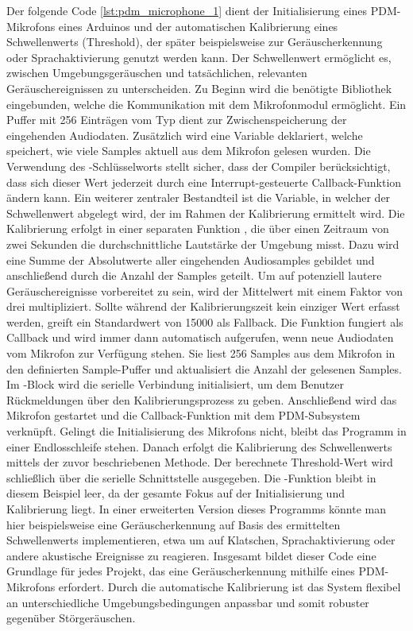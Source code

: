 Der folgende Code \ref{lst:pdm_microphone_1} dient der Initialisierung eines PDM-Mikrofons eines Arduinos und der automatischen Kalibrierung eines Schwellenwerts (Threshold), der später beispielsweise zur Geräuscherkennung oder Sprachaktivierung genutzt werden kann. Der Schwellenwert ermöglicht es, zwischen Umgebungsgeräuschen und tatsächlichen, relevanten Geräuschereignissen zu unterscheiden.
Zu Beginn wird die benötigte Bibliothek  eingebunden, welche die Kommunikation mit dem Mikrofonmodul ermöglicht. Ein Puffer mit 256 Einträgen vom Typ  dient zur Zwischenspeicherung der eingehenden Audiodaten. Zusätzlich wird eine  Variable  deklariert, welche speichert, wie viele Samples aktuell aus dem Mikrofon gelesen wurden. Die Verwendung des -Schlüsselworts stellt sicher, dass der Compiler berücksichtigt, dass sich dieser Wert jederzeit durch eine Interrupt-gesteuerte Callback-Funktion ändern kann.
Ein weiterer zentraler Bestandteil ist die Variable, in welcher der Schwellenwert abgelegt wird, der im Rahmen der Kalibrierung ermittelt wird. Die Kalibrierung erfolgt in einer separaten Funktion , die über einen Zeitraum von zwei Sekunden die durchschnittliche Lautstärke der Umgebung misst. Dazu wird eine Summe der Absolutwerte aller eingehenden Audiosamples gebildet und anschließend durch die Anzahl der Samples geteilt. Um auf potenziell lautere Geräuschereignisse vorbereitet zu sein, wird der Mittelwert mit einem Faktor von drei multipliziert. Sollte während der Kalibrierungszeit kein einziger Wert erfasst werden, greift ein Standardwert von 15000 als Fallback.
Die Funktion  fungiert als Callback und wird immer dann automatisch aufgerufen, wenn neue Audiodaten vom Mikrofon zur Verfügung stehen. Sie liest 256 Samples aus dem Mikrofon in den definierten Sample-Puffer und aktualisiert die Anzahl der gelesenen Samples.
Im -Block wird die serielle Verbindung initialisiert, um dem Benutzer Rückmeldungen über den Kalibrierungsprozess zu geben. Anschließend wird das Mikrofon gestartet und die Callback-Funktion mit dem PDM-Subsystem verknüpft. Gelingt die Initialisierung des Mikrofons nicht, bleibt das Programm in einer Endlosschleife stehen. Danach erfolgt die Kalibrierung des Schwellenwerts mittels der zuvor beschriebenen Methode. Der berechnete Threshold-Wert wird schließlich über die serielle Schnittstelle ausgegeben.
Die -Funktion bleibt in diesem Beispiel leer, da der gesamte Fokus auf der Initialisierung und Kalibrierung liegt. In einer erweiterten Version dieses Programms könnte man hier beispielsweise eine Geräuscherkennung auf Basis des ermittelten Schwellenwerts implementieren, etwa um auf Klatschen, Sprachaktivierung oder andere akustische Ereignisse zu reagieren.
Insgesamt bildet dieser Code eine Grundlage für jedes Projekt, das eine Geräuscherkennung mithilfe eines PDM-Mikrofons erfordert. Durch die automatische Kalibrierung ist das System flexibel an unterschiedliche Umgebungsbedingungen anpassbar und somit robuster gegenüber Störgeräuschen.

